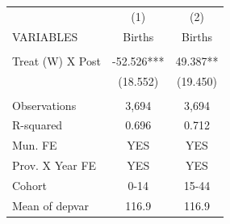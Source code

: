 \begin{tabular}{lcc} \hline
 & (1) & (2) \\
VARIABLES & Births & Births \\ \hline
 &  &  \\
Treat (W) X Post & -52.526*** & 49.387** \\
 & (18.552) & (19.450) \\
 &  &  \\
Observations & 3,694 & 3,694 \\
R-squared & 0.696 & 0.712 \\
Mun. FE & YES & YES \\
Prov. X Year FE & YES & YES \\
Cohort & 0-14 & 15-44 \\
 Mean of depvar & 116.9 & 116.9 \\ \hline
\end{tabular}
